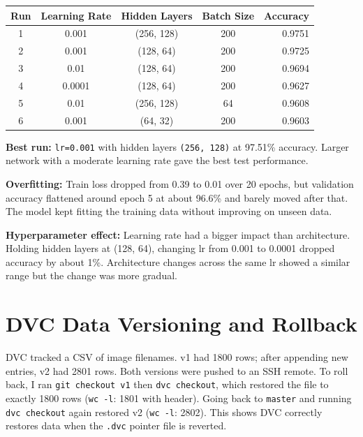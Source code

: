 \documentclass[10pt, a4paper]{article}
\begin{document}
\vspace{2pt}
\begin{center}
\small
\begin{tabular}{ccccr}
\toprule
\textbf{Run} & \textbf{Learning Rate} & \textbf{Hidden Layers} & \textbf{Batch Size} & \textbf{Accuracy} \\
\midrule
1 & 0.001  & (256, 128) & 200 & 0.9751 \\
2 & 0.001  & (128, 64)  & 200 & 0.9725 \\
3 & 0.01   & (128, 64)  & 200 & 0.9694 \\
4 & 0.0001 & (128, 64)  & 200 & 0.9627 \\
5 & 0.01   & (256, 128) & 64  & 0.9608 \\
6 & 0.001  & (64, 32)   & 200 & 0.9603 \\
\bottomrule
\end{tabular}
\end{center}
\vspace{2pt}

\textbf{Best run:} \texttt{lr=0.001} with hidden layers \texttt{(256, 128)} at 97.51\% accuracy. Larger network with a moderate learning rate gave the best test performance.

\textbf{Overfitting:} Train loss dropped from 0.39 to 0.01 over 20 epochs, but validation accuracy flattened around epoch 5 at about 96.6\% and barely moved after that. The model kept fitting the training data without improving on unseen data.

\textbf{Hyperparameter effect:} Learning rate had a bigger impact than architecture. Holding hidden layers at (128, 64), changing lr from 0.001 to 0.0001 dropped accuracy by about 1\%. Architecture changes across the same lr showed a similar range but the change was more gradual.

\section{DVC Data Versioning and Rollback}

DVC tracked a CSV of image filenames. v1 had 1800 rows; after appending new entries, v2 had 2801 rows. Both versions were pushed to an SSH remote. To roll back, I ran \texttt{git checkout v1} then \texttt{dvc checkout}, which restored the file to exactly 1800 rows (\texttt{wc -l}: 1801 with header). Going back to \texttt{master} and running \texttt{dvc checkout} again restored v2 (\texttt{wc -l}: 2802). This shows DVC correctly restores data when the \texttt{.dvc} pointer file is reverted.
\end{document}
